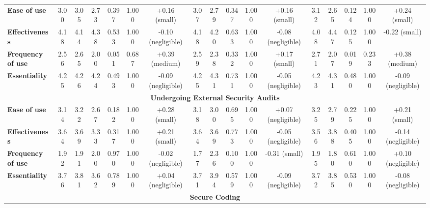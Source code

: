 \begin{tiny}
\begin{longtable}{@{}lcccccccccccccccc@{}}
\bottomrule
\endlastfoot
\multicolumn{17}{c}{\textbf{Architectural Risk Analysis}} \\ \midrule
\textbf{Ease of use} & 3.00 & 3.05 & 2.73 & 0.397 & 1.000 & \multicolumn{1}{c|}{+0.16 (small)} & 3.07 & 2.79 & 0.347 & 1.000 & \multicolumn{1}{c|}{+0.16 (small)} & 3.12 & 2.65 & 0.124 & 1.000 & +0.24 (small) \\ \midrule
\textbf{Effectiveness} & 4.18 & 4.14 & 4.38 & 0.533 & 1.000 & \multicolumn{1}{c|}{-0.10 (negligible)} & 4.18 & 4.20 & 0.633 & 1.000 & \multicolumn{1}{c|}{-0.08 (negligible)} & 4.08 & 4.47 & 0.125 & 1.000 & -0.22 (small) \\ \midrule
\textbf{Frequency of use} & 2.56 & 2.65 & 2.00 & 0.051 & 0.687 & \multicolumn{1}{c|}{+0.39 (medium)} & 2.59 & 2.38 & 0.332 & 1.000 & \multicolumn{1}{c|}{+0.17 (small)} & 2.71 & 2.07 & 0.019 & 0.233 & +0.38 (medium) \\ \midrule
\textbf{Essentiality} & 4.25 & 4.26 & 4.24 & 0.493 & 1.000 & \multicolumn{1}{c|}{-0.09 (negligible)} & 4.25 & 4.31 & 0.731 & 1.000 & \multicolumn{1}{c|}{-0.05 (negligible)} & 4.23 & 4.31 & 0.480 & 1.000 & -0.09 (negligible) \\ \midrule
\multicolumn{17}{c}{\textbf{Undergoing External Security Audits}} \\ \midrule
\textbf{Ease of use} & 3.14 & 3.22 & 2.67 & 0.182 & 1.000 & \multicolumn{1}{c|}{+0.28 (small)} & 3.18 & 3.00 & 0.695 & 1.000 & \multicolumn{1}{c|}{+0.07 (negligible)} & 3.25 & 2.79 & 0.225 & 1.000 & +0.21 (small) \\ \midrule
\textbf{Effectiveness} & 3.64 & 3.69 & 3.33 & 0.317 & 1.000 & \multicolumn{1}{c|}{+0.21 (small)} & 3.64 & 3.69 & 0.773 & 1.000 & \multicolumn{1}{c|}{-0.05 (negligible)} & 3.56 & 3.88 & 0.405 & 1.000 & -0.14 (negligible) \\ \midrule
\textbf{Frequency of use} & 1.92 & 1.91 & 2.00 & 0.970 & 1.000 & \multicolumn{1}{c|}{-0.02 (negligible)} & 1.77 & 2.36 & 0.100 & 1.000 & \multicolumn{1}{c|}{-0.31 (small)} & 1.95 & 1.80 & 0.610 & 1.000 & +0.10 (negligible) \\ \midrule
\textbf{Essentiality} & 3.76 & 3.81 & 3.62 & 0.789 & 1.000 & \multicolumn{1}{c|}{+0.04 (negligible)} & 3.71 & 3.94 & 0.579 & 1.000 & \multicolumn{1}{c|}{-0.09 (negligible)} & 3.72 & 3.85 & 0.530 & 1.000 & -0.08 (negligible) \\ \midrule
\multicolumn{17}{c}{\textbf{Secure Coding}} \\ \midrule

\end{longtable}
\end{tiny}
